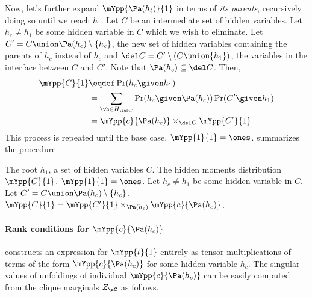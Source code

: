 Now, let's further expand $\mYpp{ \Pa(h_t) }{1}$ in terms of {\em its
  parents}, recursively doing so until we reach $h_1$.
Let $C$ be an intermediate set of hidden variables. Let $h_c \neq h_1$
  be some hidden variable in $C$ which we wish to eliminate. 
Let $C' = C \union \Pa(h_c) \setminus \{h_c\}$, the new set of hidden
  variables containing the parents of $h_c$ instead of $h_c$ and $\del
  C = C' \setminus (C \union \{h_1\})$, the variables in the interface
  between $C$ and $C'$.
Note that $\Pa(h_c) \subseteq \del C$.
Then,
\begin{align}
  \mYpp{C}{1} &\eqdef \Pr( h_c \given h_1 ) \nonumber \\
  &= \sum_{\vh \in H_{\del C}} \Pr( h_c \given \Pa(h_c) ) \Pr( C' \given h_1 ) \nonumber \\
  &= \mYpp{c}{\Pa(h_c)}  \times_{\del C} \mYpp{ C' }{ 1 }. \label{eqn:recursive-step}
\end{align}
This process is repeated until the base case, $\mYpp{1}{1} = \ones$.
 summarizes the procedure.

\begin{algorithm}
  \caption{$\mYpp{C}{1}$}
  \label{algo:Y}
  \begin{algorithmic}
    \REQUIRE The root $h_1$, a set of hidden variables $C$.
    \ENSURE The hidden moments distribution $\mYpp{C}{1}$.
      \STATE $\mYpp{1}{1} = \ones$.
    \ELSE
      \STATE Let $h_c \neq h_1$ be some hidden variable in $C$.
      \STATE Let $C' = C \union \Pa(h_c) \setminus \{h_c\}$.
      \STATE $\mYpp{C}{1} = \mYpp{C'}{1} \times_{\Pa(h_c)} \mYpp{c}{\Pa(h_c)}$.
    \ENDIF
  \end{algorithmic}
\end{algorithm}

\paragraph{Rank conditions for $\mYpp{c}{\Pa(h_c)}$}

 constructs an expression for $\mYpp{t}{1}$ entirely as
  tensor multiplications of terms of the form $\mYpp{c}{\Pa(h_c)}$ for
  some hidden variable $h_c$. 
The singular values of unfoldings of individual $\mYpp{c}{\Pa(h_c)}$ can
  be easily computed from the clique marginals $Z_\sC$ as follows.

